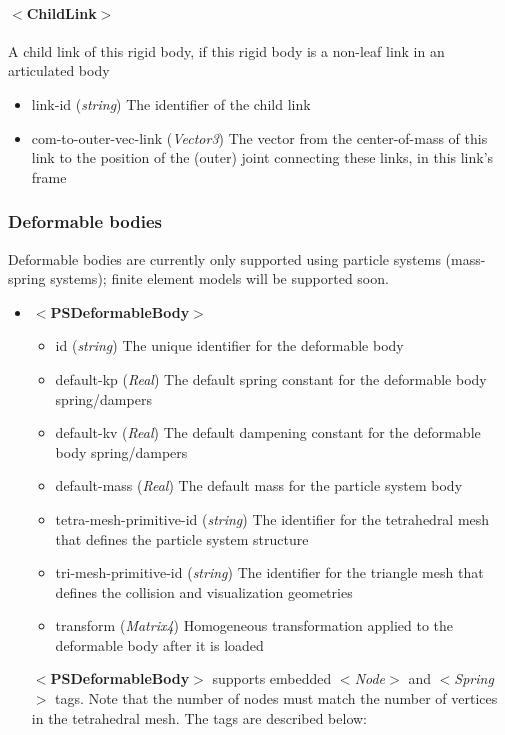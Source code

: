 \documentclass{article}
\begin{document}
\begin{landscape}
\paragraph{$<$ChildLink$>$}
A child link of this rigid body, if this rigid body is a non-leaf link in an articulated body
\begin{itemize}
\item link-id  (\emph{string}) The identifier of the child link
\item com-to-outer-vec-link  (\emph{Vector3}) The vector from the center-of-mass of this link to the position of the (outer) joint connecting these links, in this link's frame 
\end{itemize}

\subsubsection{Deformable bodies}
Deformable bodies are currently only supported using particle systems 
(mass-spring systems); finite element models will be supported soon.

\begin{itemize}
\item $<$\textbf{PSDeformableBody}$>$
\begin{itemize}
\item id  (\emph{string}) The unique identifier for the deformable body
\item default-kp  (\emph{Real}) The default spring constant for the deformable body spring/dampers
\item default-kv  (\emph{Real}) The default dampening constant for the deformable body spring/dampers
\item default-mass  (\emph{Real}) The default mass for the particle system body
\item tetra-mesh-primitive-id  (\emph{string}) The identifier for the tetrahedral mesh that defines the particle system structure
\item tri-mesh-primitive-id  (\emph{string})  The identifier for the triangle mesh that defines the collision and visualization geometries
\item transform  (\emph{Matrix4})  Homogeneous transformation applied to the
      deformable body after it is loaded
\end{itemize} %

$<$\textbf{PSDeformableBody}$>$ supports embedded $<$\emph{Node}$>$ and $<$\emph{Spring}$>$ tags.  Note that the number of nodes must match the number of vertices in
the tetrahedral mesh.  The tags are described below:


\end{itemize}
\end{landscape}
\end{document}
